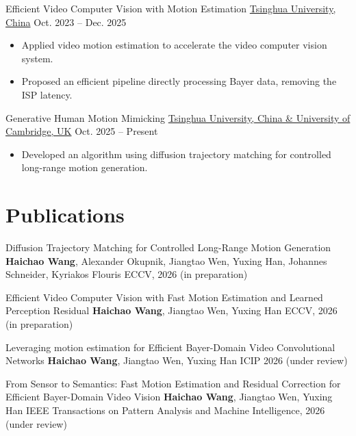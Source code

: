 \documentclass[11pt]{article}
\begin{document}
\resentry
    {Efficient Video Computer Vision with Motion Estimation}
    {\href{https://www.tsinghua.edu.cn/}{Tsinghua University, China}}
    {Oct. 2023 -- Dec. 2025}
    {\begin{itemize}
        \item Applied video motion estimation to accelerate the video computer vision system.
        \item Proposed an efficient pipeline directly processing Bayer data, removing the ISP latency.
    \end{itemize}}

\resentry
    {Generative Human Motion Mimicking}
    {\href{https://www.cam.ac.uk/}{Tsinghua University, China \& University of Cambridge, UK}}
    {Oct. 2025 -- Present}
    {\begin{itemize}
        \item Developed an algorithm using diffusion trajectory matching for controlled long-range motion generation.
    \end{itemize}}
    


\section{Publications}

\pubentry
    {Diffusion Trajectory Matching for Controlled Long-Range Motion Generation}
    {\textbf{Haichao Wang}, Alexander Okupnik, Jiangtao Wen, Yuxing Han, Johannes Schneider, Kyriakos Flouris}
    {ECCV, 2026 (in preparation)}

\pubentry
    {Efficient Video Computer Vision with Fast Motion Estimation and Learned Perception Residual}
    {\textbf{Haichao Wang}, Jiangtao Wen, Yuxing Han}
    {ECCV, 2026 (in preparation)}

\pubentry
    {Leveraging motion estimation for Efficient Bayer-Domain Video Convolutional Networks}
    {\textbf{Haichao Wang}, Jiangtao Wen, Yuxing Han}
    {ICIP 2026 (under review)}

\pubentry
    {From Sensor to Semantics: Fast Motion Estimation and Residual Correction for Efficient Bayer-Domain Video Vision}
    {\textbf{Haichao Wang}, Jiangtao Wen, Yuxing Han}
    {IEEE Transactions on Pattern Analysis and Machine Intelligence, 2026 (under review)}
\end{document}
